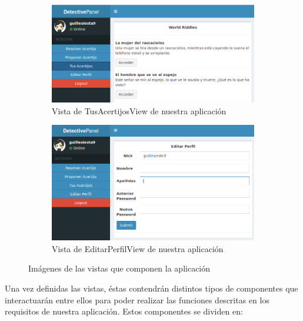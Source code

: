 \begin{figure}[htbp]\ContinuedFloat
\centering
\begin{subfigure}{.8\textwidth}
    \includegraphics[width=\linewidth]{figuras/tusacertijosview.png}
    \caption{Vista de TusAcertijosView de nuestra aplicación}
    \label{fig::tusacertijosview}
\end{subfigure}
\begin{subfigure}{.8\textwidth}
    \includegraphics[width=\linewidth]{figuras/editarperfilview.png}
    \caption{Vista de EditarPerfilView de nuestra aplicación} 
    \label{fig::editarperfilview}
\end{subfigure}
\caption{Imágenes de las vistas que componen la aplicación}
\label{fig::vistas}
\end{figure}
Una vez definidas las vistas, éstas contendrán distintos tipos de componentes que interactuarán entre ellos para poder realizar las funciones descritas en los requisitos de nuestra aplicación. Estos componentes se dividen en:

